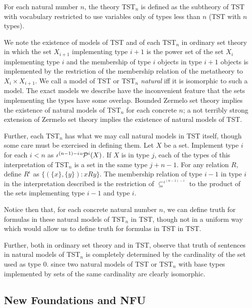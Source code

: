 \documentclass[112pt]{article}
\begin{document}
For each natural number $n$, the theory TST$_n$ is defined as the subtheory of TST with vocabulary restricted to use variables only of types less than $n$ (TST with $n$ types).

We note the existence of models of TST and of each TST$_n$ in ordinary set theory in which the set $X_{i+1}$ implementing
type $i+1$ is the power set of the set $X_i$ implementing type $i$ and the membership of type $i$ objects in type $i+1$ objects is implemented by the restriction of the membership relation of the metatheory to $X_i \times X_{i+1}$.  We call
a model of TST or TST$_n$ {\em natural\/} iff it is isomorphic to such a model.  The exact models we describe have the inconvenient feature that the sets implementing the types have some overlap.  Bounded Zermelo set theory implies the existence of natural models of TST$_n$ for each concrete $n$;  a not terribly strong extension of Zermelo set theory implies the existence of natural models of TST.


Further, each TST$_n$ has what we may call natural models in TST itself, though some care must be exercised in defining them.  Let $X$ be a set.  Implement type $i$ for each $i<n$ as
$\iota^{(n-1)-i}``{\cal P}^i(X)$.  If $X$ is in type $j$, each of the types of this interpretation of TST$_n$ is a set in the same type $j+n-1$.  For any relation $R$, define
$R^{\iota}$ as $\{(\{x\},\{y\}):x R y\}$.  The membership relation of type $i-1$ in type $i$ in the interpretation described is the restriction of $\subseteq^{\iota^{(n-1)-i}}$ to
the product of the sets implementing type $i-1$ and type $i$.\label{tstnmodel}

Notice then that, for each concrete natural number $n$, we can define truth for formulas in these natural models of TST$_n$  in TST, though not in a uniform way which would allow us to define truth for formulas
in TST in TST.

Further, both in ordinary set theory and in TST, observe that truth of sentences in natural models of TST$_n$ is completely determined by the cardinality of the set used as type 0.
since two natural models of TST or TST$_n$ with base types implemented by sets of the same cardinality are clearly isomorphic. 

\newpage

\subsection{New Foundations and NFU}
\end{document}
